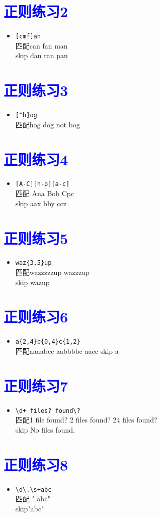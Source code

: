\documentclass{article}
\begin{document}
\section{\textcolor{blue}{正则练习2}}
\begin{itemize}
\item \verb|[cmf]an| \\ 匹配can fan man \\skip dan ran pan
\end{itemize}
\section{\textcolor{blue}{正则练习3}}
\begin{itemize}
\item \verb|[^b]og| \\ 匹配hog dog not bog
\end{itemize}
\section{\textcolor{blue}{正则练习4}}
\begin{itemize}
\item \verb|[A-C][n-p][a-c]| \\ 匹配 Ana Bob Cpc \\skip aax bby ccz
\end{itemize}
\section{\textcolor{blue}{正则练习5}}
\begin{itemize}
\item \verb|waz{3,5}up| \\ 匹配wazzzzzup wazzzup \\skip wazup
\end{itemize}
\section{\textcolor{blue}{正则练习6}}
\begin{itemize}
\item \verb|a{2,4}b{0,4}c{1,2}| \\ 匹配aaaabcc aabbbbc aacc skip a
\end{itemize}
\section{\textcolor{blue}{正则练习7}}
\begin{itemize}
\item \verb|\d+ files? found\?| \\ 匹配1 file found?  2 files found? 24 files found?
\\ skip No files found.
\end{itemize}
\section{\textcolor{blue}{正则练习8}}
\begin{itemize}
\item \verb|\d\.\s+abc| \\ 匹配 " abc" \\skip"abc"
\end{itemize}
\end{document}
